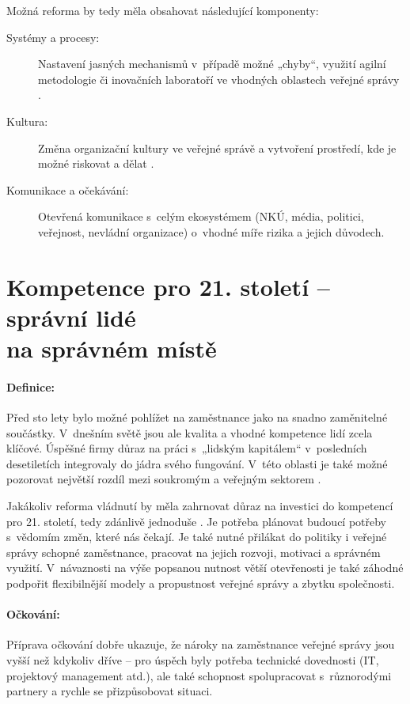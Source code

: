 Možná reforma by tedy měla obsahovat následující komponenty:

\begin{description}
  \item[Systémy a procesy:] Nastavení jasných mechanismů v~případě možné „chyby“, využití agilní metodologie \cite{christopher_blueprint_2021} či inovačních laboratoří ve vhodných oblastech veřejné správy \cite{ministerstvo_pro_mistni_rozvoj_cr_ministerstvo_2020}.
  \item[Kultura:] Změna organizační kultury ve veřejné správě a vytvoření prostředí, kde je možné riskovat a dělat .
  \item[Komunikace a očekávání:] Otevřená komunikace s~celým ekosystémem (NKÚ, média, politici, veřejnost, nevládní organizace) o~vhodné míře rizika a jejich důvodech.
\end{description}

\section*{Kompetence pro 21. století -- správní lidé \\ na správném místě}

\paragraph{Definice:} Před sto lety bylo možné pohlížet na zaměstnance jako na snadno za\-mě\-ni\-tel\-né součástky. V~dnešním světě jsou ale kvalita a vhodné kompetence lidí zcela klíčové. Úspěšné firmy důraz na práci s~„lidským kapitálem“ v~posledních desetiletích integrovaly do jádra svého fungování. V~této oblasti je také možné pozorovat největší rozdíl mezi soukromým a veřejným sektorem \cite{d_eggers_future_2020}.

Jakákoliv reforma vládnutí by měla zahrnovat důraz na investici do kompetencí pro 21. století, tedy zdánlivě jednoduše . Je potřeba plánovat budoucí potřeby s~vědomím změn, které nás čekají. Je také nutné přilákat do politiky i veřejné správy schopné zaměstnance, pracovat na jejich rozvoji, motivaci a správném využití. V~návaznosti na výše popsanou nutnost větší otevřenosti je také záhodné podpořit flexibilnější modely a propustnost veřejné správy a zbytku společnosti.

\paragraph{Očkování:} Příprava očkování dobře ukazuje, že nároky na zaměstnance veřejné správy jsou vyšší než kdykoliv dříve -- pro úspěch byly potřeba technické dovednosti (IT, projektový management atd.), ale také schopnost spolupracovat s~různorodými partnery a rychle se přizpůsobovat situaci. 

